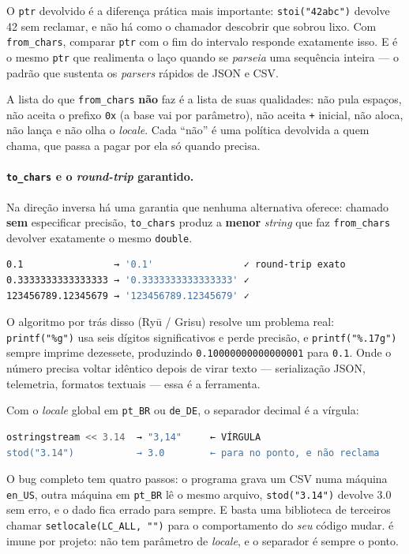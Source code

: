 O \texttt{ptr} devolvido é a diferença prática mais importante:
\texttt{stoi("42abc")} devolve 42 sem reclamar, e não há como o chamador
descobrir que sobrou lixo. Com \texttt{from\_chars}, comparar \texttt{ptr} com o
fim do intervalo responde exatamente isso. E é o mesmo \texttt{ptr} que
realimenta o laço quando se \emph{parseia} uma sequência inteira --- o padrão
que sustenta os \emph{parsers} rápidos de JSON e CSV.

A lista do que \texttt{from\_chars} \textbf{não} faz é a lista de suas
qualidades: não pula espaços, não aceita o prefixo \texttt{0x} (a base vai por
parâmetro), não aceita \texttt{+} inicial, não aloca, não lança e não olha o
\emph{locale}. Cada ``não'' é uma política devolvida a quem chama, que passa a
pagar por ela só quando precisa.

\paragraph{\texttt{to\_chars} e o \emph{round-trip} garantido.} Na direção
inversa há uma garantia que nenhuma alternativa oferece: chamado \textbf{sem}
especificar precisão, \texttt{to\_chars} produz a \textbf{menor} \emph{string}
que faz \texttt{from\_chars} devolver exatamente o mesmo \texttt{double}.

\begin{lstlisting}[style=bt, language=bash,
    caption={Saída de \texttt{src/strings/}: ida e volta exata.}]
0.1                → '0.1'                ✓ round-trip exato
0.3333333333333333 → '0.3333333333333333' ✓
123456789.12345679 → '123456789.12345679' ✓
\end{lstlisting}

O algoritmo por trás disso (Ryū / Grisu) resolve um problema real:
\texttt{printf("\%g")} usa seis dígitos significativos e perde precisão, e
\texttt{printf("\%.17g")} sempre imprime dezessete, produzindo
\texttt{0.10000000000000001} para \texttt{0.1}. Onde o número precisa voltar
idêntico depois de virar texto --- serialização JSON, telemetria, formatos
textuais --- essa é a ferramenta.

\begin{armadilha}
Com o \emph{locale} global em \texttt{pt\_BR} ou \texttt{de\_DE}, o separador
decimal é a vírgula:
\begin{lstlisting}[style=bt, language=bash, frame=none,
                   xleftmargin=0pt, xrightmargin=0pt]
ostringstream << 3.14  → "3,14"     ← VÍRGULA
stod("3.14")           → 3.0        ← para no ponto, e não reclama
\end{lstlisting}
O bug completo tem quatro passos: o programa grava um CSV numa máquina
\texttt{en\_US}, outra máquina em \texttt{pt\_BR} lê o mesmo arquivo,
\texttt{stod("3.14")} devolve 3.0 sem erro, e o dado fica errado para sempre. E
basta uma biblioteca de terceiros chamar \texttt{setlocale(LC\_ALL, "")} para o
comportamento do \emph{seu} código mudar.  é imune por
projeto: não tem parâmetro de \emph{locale}, e o separador é sempre o ponto.
\end{armadilha}

